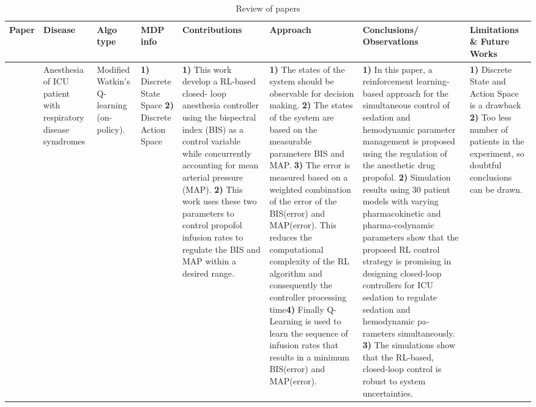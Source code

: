 \begin{table}[!th]
\caption{Review of papers}
\label{tab:review6}
\begin{tabular}{|p{5 em}|p{4 em}|p{3 em}|p{3em}|p{6em}|p{6em}|p{6 em}|p{6em}|}
\toprule
Paper  & Disease  & Algo type & MDP info & Contributions  & Approach & Conclusions/ Observations  & Limitations \& Future Works \\
\hline
\citet{DBLP:conf/adprl/PadmanabhanMH14} & Anesthesia of ICU patient with respiratory  disease symdromes
& 
Modified Watkin's Q-learning (on-policy).
& 
\textbf{1)} Discrete State Space 
\textbf{2)} Discrete Action Space 
&  
\textbf{1)} This work develop a RL-based closed-
loop anesthesia controller using the bispectral index (BIS) as a control variable while concurrently accounting for mean
arterial pressure (MAP). \textbf{2)} This work uses these two parameters to control propofol infusion rates to
regulate the BIS and MAP within a desired range. 
&
\textbf{1)} The states of the system
should be observable for decision making. \textbf{2)} The states of the  system are based on the measurable parameters BIS and MAP. \textbf{3)} The error is measured based on  a weighted combination of the error of the BIS(error) and MAP(error). This reduces the computational complexity of the RL algorithm and
consequently the controller processing time\textbf{4)} Finally Q-Learning is used to learn the sequence of infusion rates that results in a minimum BIS(error) and MAP(error). 
& 
\textbf{1)} In this paper, a reinforcement learning-based approach
for the simultaneous control of sedation and hemodynamic
parameter management is proposed using the regulation of
the anesthetic drug propofol. 
\textbf{2)} Simulation results using 30 patient models with varying pharmacokinetic and pharma-codynamic parameters show that the proposed RL control strategy is promising in designing closed-loop controllers for ICU sedation to regulate sedation and hemodynamic pa-
rameters simultaneously. \textbf{3)} The simulations show
that the RL-based, closed-loop control is robust to system
uncertainties. 
& 
\textbf{1)}  Discrete State and Action Space is a drawback
\textbf{2)} Too less number of patients in the experiment, so doubtful conclusions can be drawn.
   \\\midrule
\end{tabular}
\vspace*{-2em}
\end{table}   

